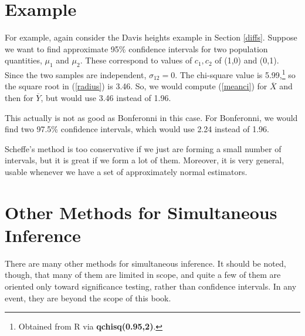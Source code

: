 \section{Example}

For example, again consider the Davis heights example in Section
\ref{diffs}.  Suppose we want to find approximate 95\% confidence
intervals for two population quantities, $\mu_1$ and $\mu_2$.  These
correspond to values of $c_1,c_2$ of (1,0) and (0,1).  Since the two
samples are independent, $\sigma_{12} = 0$.  The chi-square value is
5.99,\footnote{Obtained from R via {\bf qchisq(0.95,2)}.} so the square
root in (\ref{radius}) is 3.46.  So, we would compute (\ref{meanci}) for
$\overline{X}$ and then for $\overline{Y}$, but would use 3.46 instead of 1.96.

This actually is not as good as Bonferonni in this case.  For
Bonferonni, we would find two 97.5\% confidence intervals, which would
use 2.24 instead of 1.96.


Scheffe's method is too conservative if we just are forming a small
number of intervals, but it is great if we form a lot of them.
Moreover, it is very general, usable whenever we have a set of
approximately normal estimators.

\section{Other Methods for Simultaneous Inference}

There are many other methods for simultaneous inference.  It should be
noted, though, that many of them are limited in scope, and quite a few
of them are oriented only toward significance testing, rather than
confidence intervals.  In any event, they are beyond the scope of this
book.


